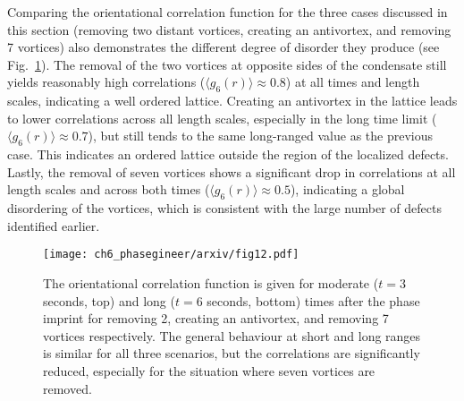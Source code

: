 Comparing the orientational correlation function for the three cases discussed in this section (removing two distant vortices, creating an antivortex, and removing 7 vortices) also demonstrates the different degree of disorder they produce (see Fig.~\ref{fig:g6_2edge_anti_nuclear}). The removal of the two vortices at opposite sides of the condensate still yields reasonably high correlations ($\langle g_6(r) \rangle \approx 0.8$) at all times and length scales, indicating a well ordered lattice. Creating an antivortex in the lattice leads to lower correlations across all length scales, especially in the long time limit ($\langle g_6(r) \rangle\approx 0.7$), but still tends to the same long-ranged value as the previous case. This indicates an ordered lattice outside the region of the localized defects. Lastly, the removal of seven vortices shows a significant drop in correlations at all length scales and across both times ($\langle g_6(r) \rangle\approx 0.5$), indicating a global disordering of the vortices, which is consistent with the large number of defects identified earlier.

\begin{figure}\centering
    \texttt{[image: ch6\_phasegineer/arxiv/fig12.pdf]}
    \caption{The orientational correlation function is given for moderate ($t=3$ seconds, top) and long ($t=6$ seconds, bottom) times after the phase imprint for removing 2, creating an antivortex, and removing 7 vortices respectively. The general behaviour at short and long ranges is similar for all three scenarios, but the correlations are significantly reduced, especially for the situation where seven vortices are removed.}\label{fig:g6_2edge_anti_nuclear}
\end{figure}

